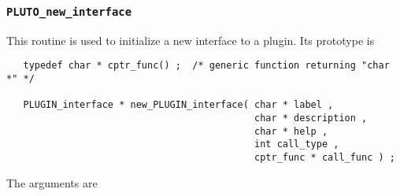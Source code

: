 \subsubsection{{\tt PLUTO\_new\_interface}}
This routine is used to initialize a new interface to a plugin.
Its prototype is
\begin{samepage}\begin{verbatim}
   typedef char * cptr_func() ;  /* generic function returning "char *" */

   PLUGIN_interface * new_PLUGIN_interface( char * label ,
                                            char * description ,
                                            char * help ,
                                            int call_type ,
                                            cptr_func * call_func ) ;
\end{verbatim}\end{samepage}
\vset\noindent
The arguments are
\renewcommand{\tb}[1]{\parbox[t]{5in}{\sloppy #1}}
